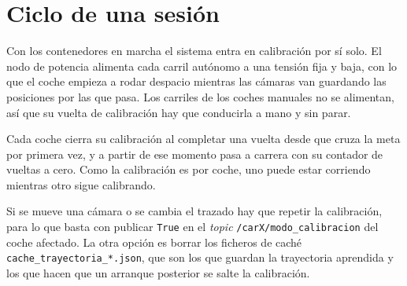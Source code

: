 \section{Ciclo de una sesión}
\label{sec:ciclo-sesion}

Con los contenedores en marcha el sistema entra en calibración por sí solo. El nodo de potencia alimenta cada carril autónomo a una tensión fija y baja, con lo que el coche empieza a rodar despacio mientras las cámaras van guardando las posiciones por las que pasa. Los carriles de los coches manuales no se alimentan, así que su vuelta de calibración hay que conducirla a mano y sin parar.

Cada coche cierra su calibración al completar una vuelta desde que cruza la meta por primera vez, y a partir de ese momento pasa a carrera con su contador de vueltas a cero. Como la calibración es por coche, uno puede estar corriendo mientras otro sigue calibrando.

Si se mueve una cámara o se cambia el trazado hay que repetir la calibración, para lo que basta con publicar \texttt{True} en el \emph{topic} \texttt{/carX/modo\_calibracion} del coche afectado. La otra opción es borrar los ficheros de caché \texttt{cache\_trayectoria\_*.json}, que son los que guardan la trayectoria aprendida y los que hacen que un arranque posterior se salte la calibración.
